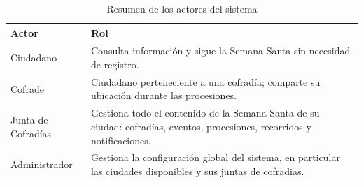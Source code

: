 \begin{table}[ht!]
\centering
\begin{tabular}{|l|p{10cm}|}
\hline
\textbf{Actor} & \textbf{Rol} \\
\hline
Ciudadano & Consulta información y sigue la Semana Santa sin necesidad de registro. \\
\hline
Cofrade & Ciudadano perteneciente a una cofradía; comparte su ubicación durante las procesiones. \\
\hline
Junta de Cofradías & Gestiona todo el contenido de la Semana Santa de su ciudad: cofradías, eventos, procesiones, recorridos y notificaciones. \\
\hline
Administrador & Gestiona la configuración global del sistema, en particular las ciudades disponibles y sus juntas de cofradias. \\
\hline
\end{tabular}
\caption{Resumen de los actores del sistema}
\label{tab:actores}
\end{table}